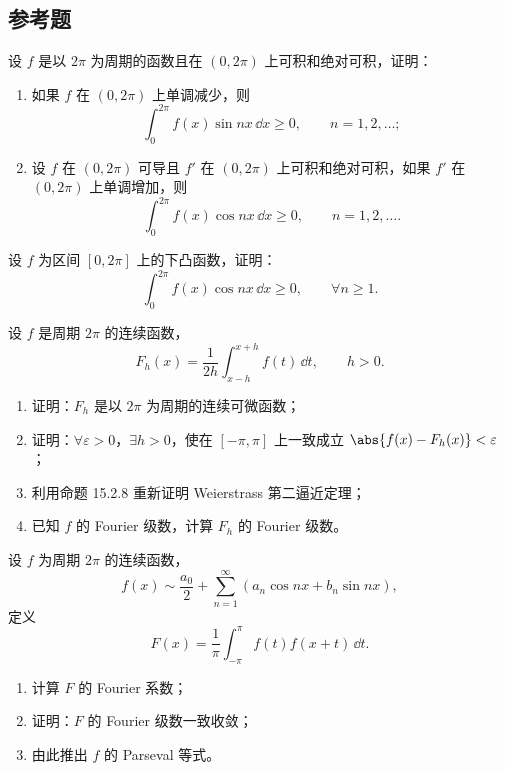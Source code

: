 \subsection{参考题}

\begin{xreferenceproblem}[1]
设 $f$ 是以 $2\pi$ 为周期的函数且在 $(0,2\pi)$ 上可积和绝对可积，证明：
  \begin{enumerate}[label=(\arabic*)]
    \item 如果 $f$ 在 $(0,2\pi)$ 上单调减少，则
    \[
      \int_0^{2\pi}f(x)\sin nx\,\dd x\ge0,\qquad n=1,2,\ldots;
    \]
    \item 设 $f$ 在 $(0,2\pi)$ 可导且 $f'$ 在 $(0,2\pi)$ 上可积和绝对可积，如果 $f'$ 在 $(0,2\pi)$ 上单调增加，则
    \[
      \int_0^{2\pi}f(x)\cos nx\,\dd x\ge0,\qquad n=1,2,\ldots.
    \]
  \end{enumerate}
\end{xreferenceproblem}

\begin{xreferenceproblem}[2]
设 $f$ 为区间 $[0,2\pi]$ 上的下凸函数，证明：
  \[
    \int_0^{2\pi}f(x)\cos nx\,\dd x\ge0,\qquad \forall n\ge1.
  \]
\end{xreferenceproblem}

\begin{xreferenceproblem}[3]
设 $f$ 是周期 $2\pi$ 的连续函数，
  \[
    F_h(x)=\frac1{2h}\int_{x-h}^{x+h}f(t)\,\dd t,\qquad h>0.
  \]
  \begin{enumerate}[label=(\arabic*)]
    \item 证明：$F_h$ 是以 $2\pi$ 为周期的连续可微函数；
    \item 证明：$\forall\varepsilon>0$，$\exists h>0$，使在 $[-\pi,\pi]$ 上一致成立 $\abs{f(x)-F_h(x)}<\varepsilon$；
    \item 利用命题 15.2.8 重新证明 Weierstrass 第二逼近定理；
    \item 已知 $f$ 的 Fourier 级数，计算 $F_h$ 的 Fourier 级数。
  \end{enumerate}
\end{xreferenceproblem}

\begin{xreferenceproblem}[4]
设 $f$ 为周期 $2\pi$ 的连续函数，
  \[
    f(x)\sim\frac{a_0}{2}+\sum_{n=1}^{\infty}(a_n\cos nx+b_n\sin nx),
  \]
  定义
  \[
    F(x)=\frac1\pi\int_{-\pi}^{\pi}f(t)f(x+t)\,\dd t.
  \]
  \begin{enumerate}[label=(\arabic*)]
    \item 计算 $F$ 的 Fourier 系数；
    \item 证明：$F$ 的 Fourier 级数一致收敛；
    \item 由此推出 $f$ 的 Parseval 等式。
  \end{enumerate}
\end{xreferenceproblem}

